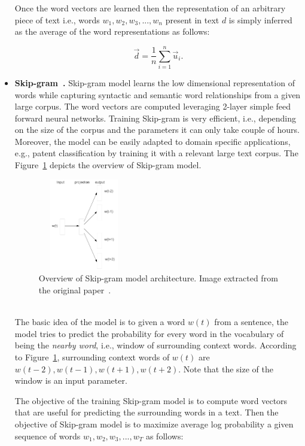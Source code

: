 \begin{itemize}
Once the word vectors are learned then the  representation of an arbitrary piece of text i.e., words $w_1, w_2, w_3,..., w_n$ present in text $d$ is simply inferred as the average of the word representations as follows:

\begin{equation}
\vec d= \frac{1}{n}\sum_{i=1}^{n}\vec u_{i}.
\end{equation}

\item \textbf{Skip-gram~\cite{DBLP:journals/corr/abs-1301-3781}.} Skip-gram model learns the low dimensional representation of words while capturing syntactic and semantic word relationships from a given large corpus. The word vectors are computed leveraging 2-layer simple feed forward neural networks. Training Skip-gram is very efficient, i.e., depending on the size of the corpus and the parameters it can only take couple of hours. Moreover, the model can be easily adapted to domain specific applications, e.g., patent classification by training it with a relevant large text corpus.
The Figure~\ref{fig:skip_gram} depicts the overview of Skip-gram model. 
\begin{figure}[h]
\centering
 \includegraphics[height=4cm,width=4cm]{Figures/fig_skip_gram.png}
 \caption{Overview of Skip-gram model architecture. Image extracted from the original paper~\cite{DBLP:journals/corr/abs-1301-3781}.}
 \label{fig:skip_gram}
\end{figure} \\
The basic idea of the model is to given a word  $w(t)$ from a sentence, the model tries to predict the  probability for every word in the vocabulary of being the \textit{nearby word}, i.e., window of surrounding context words. According to Figure~\ref{fig:skip_gram}, surrounding context words of $w(t)$ are $w(t-2), w(t-1), w(t+1), w(t+2)$. Note that the size of the window is an input parameter. %

The objective of the training Skip-gram model is to compute word vectors that are useful for predicting the surrounding words in a text. Then the objective of Skip-gram model is to maximize average log probability a given sequence of words $w_1, w_2, w_3, ..., w_T$ as follows: 


\end{itemize}
